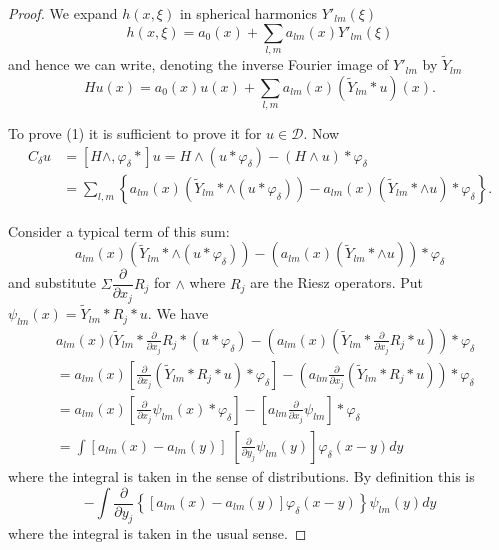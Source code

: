 \begin{proof}%
We expand $h(x, \xi)$ in spherical harmonics $Y'_{lm}(\xi)$
$$
h(x, \xi ) = a_0 (x) + \sum_{l,m} a_{lm}(x) Y'_{lm} (\xi) 
$$
and hence we can write, denoting the inverse Fourier image of
$Y'_{lm}$ by $\tilde{Y}_{lm}$  
$$
Hu (x) = a_0 (x) u(x) + \sum_{l,m} a_{lm} (x) (\tilde{Y}_{lm} * u) (x).
$$

To prove (1) it is sufficient to prove it for $u \in
\mathscr{D}$. Now  
\begin{align*}
C_\delta u & = [H \wedge, \varphi_\delta *] u = H \wedge (u *
\varphi_\delta)- (H \wedge u) * \varphi_\delta \\ 
& =  \sum_{l,m } \left\{ a_{lm}(x) (\tilde{Y}_{lm} * \wedge (u *
\varphi_\delta ))- a_{lm}(x) (\tilde{Y}_{lm} * \wedge u)* \varphi_\delta
\right\}.\tag{5.27}\label{chap3-eq5.27} 
\end{align*}\pageoriginale

Consider a typical term of this sum:
$$
a_{lm} (x) (\tilde{Y}_{lm} * \wedge (u * \varphi_\delta )) - (a_{lm}(x) 
(\tilde{Y}_{lm} * \wedge u)) * \varphi_\delta 
$$
and substitute $\Sigma \dfrac{\partial}{\partial x_j} R_j $ for
$\wedge $ where $R_j$ are the Riesz operators. Put $\psi_{lm}(x)=
\tilde{Y}_{lm} * R_j * u$. We have 
\begin{align*}
& a_{lm} (x) (\tilde{Y}_{lm} * \frac{\partial}{\partial x_j} R_j * (u
  * \varphi_\delta )- (a_{lm}(x) (\tilde{Y}_{lm} *
  \frac{\partial}{\partial x_j} R_j * u )) * \varphi_\delta \\ 
&= a_{lm}(x) \left[\frac{\partial}{\partial x_j}(\tilde{Y}_{lm} * R_j * u)
    * \varphi_\delta \right] - (a_{lm} \frac{\partial}{\partial x_j}
  (\tilde{Y}_{lm} * R_j *  u)) * \varphi_\delta \\ 
&= a_{lm}(x) \left[\frac{\partial}{\partial x_j} \psi_{lm}(x) *
    \varphi_\delta \right] - \left[a_{lm} \frac{\partial}{\partial x_j}
    \psi_{lm} \right]* \varphi_\delta\\ 
& = \int \left[a_{lm} (x)- a_{lm} (y) \right] \;
  \left[\frac{\partial}{\partial y_j} 
    \psi_{lm}(y) \right] \varphi_\delta (x-y) dy  
\end{align*}
where the integral is taken in the sense of distributions. By
definition this is  
$$
- \int \frac{\partial}{\partial y_j} \left\{[a_{lm} (x)- a_{lm} (y) ]
\varphi_\delta (x-y) \right\} \psi_{lm} (y)  dy  
$$
where the integral is taken in the usual sense.


\end{proof}
